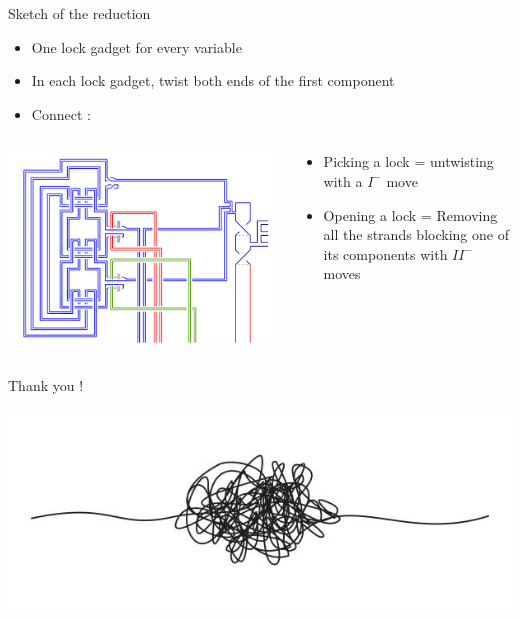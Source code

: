 \documentclass[11pt,xcolor=dvipsnames,presentation,aspectratio=169]{beamer}
\begin{document}
\begin{frame}{Sketch of the reduction}
  \begin{itemize}
  \item One lock gadget for every variable
  \item In each lock gadget, twist both ends of the first component
  \item Connect :
  \end{itemize}
  \begin{columns}
    \begin{column}{.5\linewidth}
      \centering
      \includegraphics[width=\linewidth]{example.pdf} 
    \end{column}
    \hfill
    \begin{column}{.5\linewidth}
      \begin{itemize}
      \item Picking a lock = untwisting with a $I^-$ move
      \item Opening a lock = Removing all the strands blocking one of its
        components with $II^-$ moves
      \end{itemize}
    \end{column}
  \end{columns}
\end{frame}

\begin{frame}
  \begin{center}
    Thank you !
    
  \includegraphics[width=.3\linewidth]{thanks.jpg}
  \end{center}
\end{frame}
\end{document}
